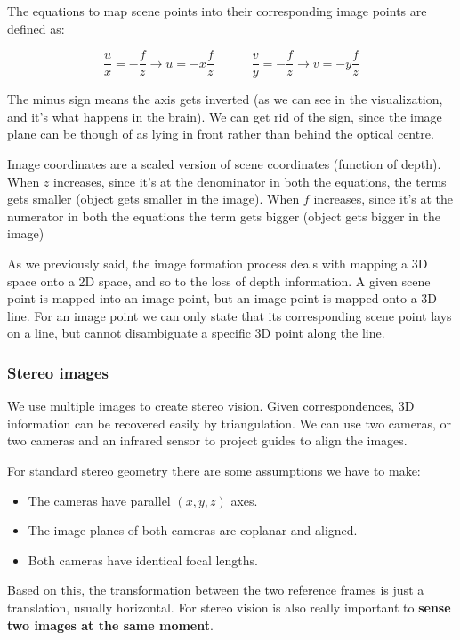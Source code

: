 \documentclass{article}
\begin{document}
The equations to map scene points into their corresponding image points are defined as:

$$\frac{u}{x} = -\frac{f}{z} \rightarrow u = -x\frac{f}{z} \quad\quad\quad \frac{v}{y} = - \frac{f}{z} \rightarrow v = -y\frac{f}{z}$$

The minus sign means the axis gets inverted (as we can see in the visualization, and it's what happens in the brain).
We can get rid of the sign, since the image plane can be though of as lying in front rather than behind the optical centre.

Image coordinates are a scaled version of scene coordinates (function of depth).
When $z$ increases, since it's at the denominator in both the equations, the terms gets smaller (object gets smaller in the image).
When $f$ increases, since it's at the numerator in both the equations the term gets bigger (object gets bigger in the image)

As we previously said, the image formation process deals with mapping a 3D space onto a 2D space, and so to the loss of depth information.
A given scene point is mapped into an image point, but an image point is mapped onto a 3D line.
For an image point we can only state that its corresponding scene point lays on a line, but cannot disambiguate a specific 3D point along the line.

\subsubsection{Stereo images}

We use multiple images to create stereo vision.
Given correspondences, 3D information can be recovered easily by triangulation.
We can use two cameras, or two cameras and an infrared sensor to project guides to align the images.

For standard stereo geometry there are some assumptions we have to make:
\begin{itemize}
  \item The cameras have parallel $(x,y,z)$ axes.
  \item The image planes of both cameras are coplanar and aligned.
  \item Both cameras have identical focal lengths.
\end{itemize}
\vspace{1em}
Based on this, the transformation between the two reference frames is just a translation, usually horizontal.
For stereo vision is also really important to \textbf{sense two images at the same moment}.
\end{document}
